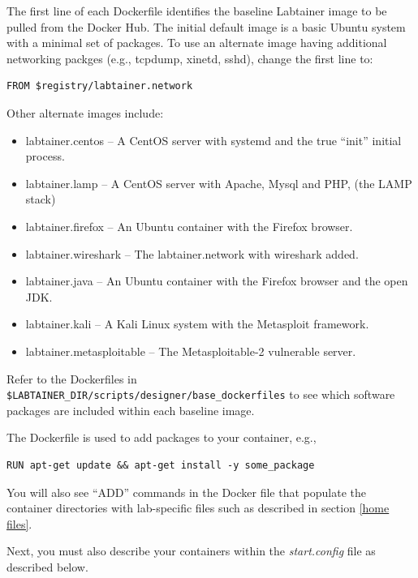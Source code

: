\documentclass[12pt]{article}
\begin{document}
The first line of each Dockerfile identifies the baseline Labtainer image to be pulled from the Docker Hub.
The initial default image is a basic Ubuntu system with a minimal set of packages.  To use an
alternate image having additional networking packges (e.g., tcpdump, xinetd, sshd), change the first line to:
\begin{verbatim}
FROM $registry/labtainer.network
\end{verbatim}
\noindent Other alternate images include:
\begin{itemize}
\item labtainer.centos -- A CentOS server with systemd and the true ``init'' initial process.
\item labtainer.lamp -- A CentOS server with Apache, Mysql and PHP, (the LAMP stack)
\item labtainer.firefox -- An Ubuntu container with the Firefox browser.
\item labtainer.wireshark -- The labtainer.network with wireshark added.
\item labtainer.java -- An Ubuntu container with the Firefox browser and the open JDK.
\item labtainer.kali -- A Kali Linux system with the Metasploit framework.
\item labtainer.metasploitable -- The Metasploitable-2 vulnerable server.
\end{itemize}
Refer to the Dockerfiles in {\tt \$LABTAINER\_DIR/scripts/designer/base\_dockerfiles} to see which
software packages are included within each baseline image. 

The Dockerfile is used to add packages to your container, e.g., 
\begin{verbatim}
RUN apt-get update && apt-get install -y some_package
\end{verbatim}

You will also see ``ADD'' commands in the Docker file that populate the container
directories with lab-specific files such as described in section \ref{home files}.

Next, you must also describe your containers within the \textit{start.config} file as described below.
\end{document}
